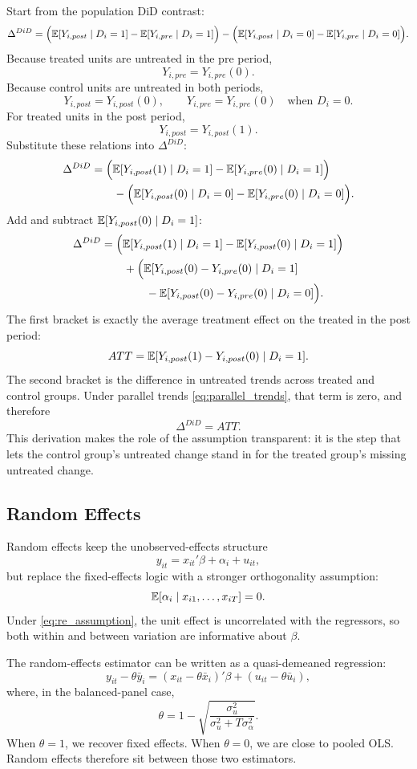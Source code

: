 Start from the population \ac{DiD} contrast:
\[
\Delta^{DiD}
=
\Big(\mathbb{E}[Y_{i,post}\mid D_i=1]-\mathbb{E}[Y_{i,pre}\mid D_i=1]\Big)
-\Big(\mathbb{E}[Y_{i,post}\mid D_i=0]-\mathbb{E}[Y_{i,pre}\mid D_i=0]\Big).
\]
Because treated units are untreated in the pre period,
\[
Y_{i,pre}=Y_{i,pre}(0).
\]
Because control units are untreated in both periods,
\[
Y_{i,post}=Y_{i,post}(0), \qquad Y_{i,pre}=Y_{i,pre}(0)
\quad \text{when } D_i=0.
\]
For treated units in the post period,
\[
Y_{i,post}=Y_{i,post}(1).
\]
Substitute these relations into $\Delta^{DiD}$:
\begin{align*}
\Delta^{DiD}
&=
\Big(\mathbb{E}[Y_{i,post}(1)\mid D_i=1]-\mathbb{E}[Y_{i,pre}(0)\mid D_i=1]\Big) \\
&\qquad - \Big(\mathbb{E}[Y_{i,post}(0)\mid D_i=0]-\mathbb{E}[Y_{i,pre}(0)\mid D_i=0]\Big).
\end{align*}
Add and subtract $\mathbb{E}[Y_{i,post}(0)\mid D_i=1]$:
\begin{align*}
\Delta^{DiD}
&=
\Big(\mathbb{E}[Y_{i,post}(1)\mid D_i=1]-\mathbb{E}[Y_{i,post}(0)\mid D_i=1]\Big) \\
&\qquad + \Big(\mathbb{E}[Y_{i,post}(0)-Y_{i,pre}(0)\mid D_i=1] \\
&\qquad\qquad - \mathbb{E}[Y_{i,post}(0)-Y_{i,pre}(0)\mid D_i=0]\Big).
\end{align*}
The first bracket is exactly the average treatment effect on the treated in the post period:
\[
ATT = \mathbb{E}[Y_{i,post}(1)-Y_{i,post}(0)\mid D_i=1].
\]
The second bracket is the difference in untreated trends across treated and control groups. Under parallel trends \eqref{eq:parallel_trends}, that term is zero, and therefore
\[
\Delta^{DiD} = ATT.
\]
This derivation makes the role of the assumption transparent: it is the step that lets the control group's untreated change stand in for the treated group's missing untreated change.

\subsection{Random Effects}
Random effects keep the unobserved-effects structure
\[
y_{it} = x_{it}'\beta + \alpha_i + u_{it},
\]
but replace the fixed-effects logic with a stronger orthogonality assumption:
\begin{equation}
\mathbb{E}[\alpha_i \mid x_{i1},\dots,x_{iT}] = 0.
\label{eq:re_assumption}
\end{equation}
Under \eqref{eq:re_assumption}, the unit effect is uncorrelated with the regressors, so both within and between variation are informative about $\beta$.

The random-effects estimator can be written as a quasi-demeaned regression:
\begin{equation}
y_{it} - \theta \bar{y}_i
=
(x_{it}-\theta \bar{x}_i)'\beta + (u_{it}-\theta \bar{u}_i),
\label{eq:re_quasi}
\end{equation}
where, in the balanced-panel case,
\begin{equation}
\theta = 1 - \sqrt{\frac{\sigma_u^2}{\sigma_u^2 + T\sigma_\alpha^2}}.
\label{eq:theta_re}
\end{equation}
When $\theta=1$, we recover fixed effects. When $\theta=0$, we are close to pooled \ac{OLS}. Random effects therefore sit between those two estimators.

